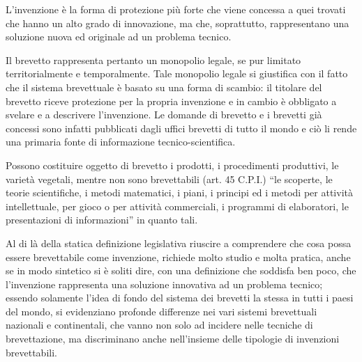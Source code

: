L'invenzione è la forma di protezione più forte che viene concessa a quei trovati che hanno un alto grado di innovazione, ma che, soprattutto, rappresentano una soluzione nuova ed originale ad un problema tecnico.

Il brevetto rappresenta pertanto un monopolio legale, se pur limitato territorialmente e temporalmente. Tale monopolio legale si giustifica con il fatto che il sistema brevettuale è basato su una forma di scambio: il titolare del brevetto riceve protezione per la propria invenzione e in cambio è obbligato a svelare e a descrivere l'invenzione. Le domande di brevetto e i brevetti già concessi sono infatti pubblicati dagli uffici brevetti di tutto il mondo e ciò li rende una primaria fonte di informazione tecnico-scientifica.

Possono costituire oggetto di brevetto i prodotti, i procedimenti produttivi, le varietà vegetali, mentre non sono brevettabili (art. 45 C.P.I.) ``le scoperte, le teorie scientifiche, i metodi matematici, i piani, i principi ed i metodi per attività intellettuale, per gioco o per attività commerciali, i programmi di elaboratori, le presentazioni di informazioni'' in quanto tali. 

Al di là della statica definizione legislativa riuscire a comprendere che cosa possa essere brevettabile come invenzione, richiede molto studio e molta pratica, anche se in modo sintetico si è soliti dire, con una definizione che soddisfa ben poco, che l'invenzione rappresenta una soluzione innovativa ad un problema tecnico; essendo solamente l'idea di fondo del sistema dei brevetti la stessa in tutti i paesi del mondo, si evidenziano profonde differenze nei vari sistemi brevettuali nazionali e continentali, che vanno non solo ad incidere nelle tecniche di brevettazione, ma discriminano anche nell'insieme delle tipologie di invenzioni brevettabili.

